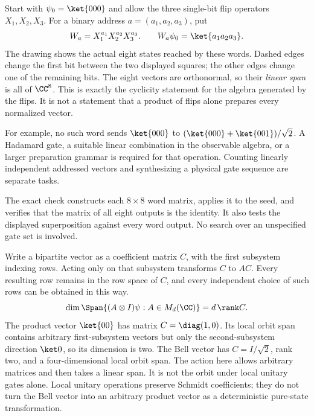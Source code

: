 Start with $\psi_0=\ket{000}$ and allow the three single-bit flip operators $X_1,X_2,X_3$. For a binary address $a=(a_1,a_2,a_3)$, put
\[
W_a=X_1^{a_1}X_2^{a_2}X_3^{a_3}.
\qquad W_a\psi_0=\ket{a_1a_2a_3}.
\]
The drawing shows the actual eight states reached by these words. Dashed edges change the first bit between the two displayed squares; the other edges change one of the remaining bits.
The eight vectors are orthonormal, so their \emph{linear span} is all of $\CC^8$. This is exactly the cyclicity statement for the algebra generated by the flips. It is not a statement that a product of flips alone prepares every normalized vector.

For example, no such word sends $\ket{000}$ to $(\ket{000}+\ket{001})/\sqrt2$. A Hadamard gate, a suitable linear combination in the observable algebra, or a larger preparation grammar is required for that operation. Counting linearly independent addressed vectors and synthesizing a physical gate sequence are separate tasks.

The exact check constructs each $8\times8$ word matrix, applies it to the seed, and verifies that the matrix of all eight outputs is the identity. It also tests the displayed superposition against every word output. No search over an unspecified gate set is involved.

Write a bipartite vector as a coefficient matrix $C$, with the first subsystem indexing rows. Acting only on that subsystem transforms $C$ to $AC$. Every resulting row remains in the row space of $C$, and every independent choice of such rows can be obtained in this way.
\[
\dim\Span\{(A\otimes I)\psi:A\in M_d(\CC)\}
=d\,\rank C.
\]
The product vector $\ket{00}$ has matrix $C=\diag(1,0)$. Its local orbit span contains arbitrary first-subsystem vectors but only the second-subsystem direction $\ket0$, so its dimension is two. The Bell vector has $C=I/\sqrt2$, rank two, and a four-dimensional local orbit span.
The action here allows arbitrary matrices and then takes a linear span. It is not the orbit under local unitary gates alone. Local unitary operations preserve Schmidt coefficients; they do not turn the Bell vector into an arbitrary product vector as a deterministic pure-state transformation.


